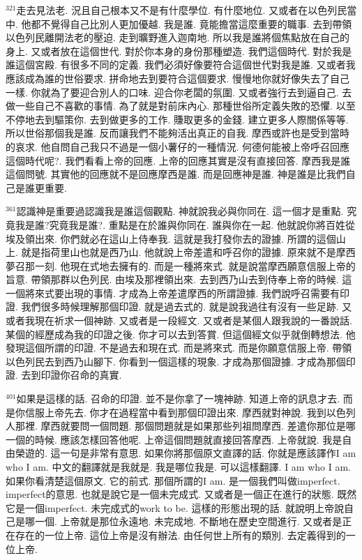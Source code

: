 \documentclass{book}
\begin{document}
$^{321}$走去見法老.
況且自己根本又不是有什麼學位.
有什麼地位.
又或者在以色列民當中.
他都不覺得自己比別人更加優越.
我是誰.
竟能擔當這麼重要的職事.
去到帶領以色列民離開法老的壓迫.
走到曠野進入迦南地.
所以我是誰將個焦點放在自己的身上.
又或者放在這個世代.
對於你本身的身份那種塑造.
我們這個時代.
對於我是誰這個宮殿.
有很多不同的定義.
我們必須好像要符合這個世代對我是誰.
又或者我應該成為誰的世俗要求.
拼命地去到要符合這個要求.
慢慢地你就好像失去了自己一樣.
你就為了要迎合別人的口味.
迎合你老闆的氛圍.
又或者強行去到逼自己.
去做一些自己不喜歡的事情.
為了就是對前床內心.
那種世俗所定義失敗的恐懼.
以至不停地去到驅策你.
去到做更多的工作.
賺取更多的金錢.
建立更多人際關係等等.
所以世俗那個我是誰.
反而讓我們不能夠活出真正的自我.
摩西或許也是受到當時的哀求.
他自問自己我只不過是一個小薯仔的一種情況.
何德何能被上帝呼召回應這個時代呢?.
我們看看上帝的回應.
上帝的回應其實是沒有直接回答.
摩西我是誰這個問號.
其實他的回應就不是回應摩西是誰.
而是回應神是誰.
神是誰是比我們自己是誰更重要.

$^{361}$認識神是重要過認識我是誰這個觀點.
神就說我必與你同在.
這一個才是重點.
究竟我是誰?究竟我是誰?.
重點是在於誰與你同在.
誰與你在一起.
他就說你將百姓從埃及領出來.
你們就必在這山上侍奉我.
這就是我打發你去的證據.
所謂的這個山上.
就是指荷里山也就是西乃山.
他就說上帝差遣和呼召你的證據.
原來就不是摩西夢召那一刻.
他現在式地去擁有的.
而是一種將來式.
就是說當摩西願意信服上帝的旨意.
帶領那群以色列民.
由埃及那裡領出來.
去到西乃山去到侍奉上帝的時候.
這一個將來式要出現的事情.
才成為上帝差遣摩西的所謂證據.
我們說呼召需要有印證.
我們很多時候理解那個印證.
就是過去式的.
就是說我過往有沒有一些足跡.
又或者我現在祈求一個神跡.
又或者是一段經文.
又或者是某個人跟我說的一番說話.
某個的經歷成為我的印證之後.
你才可以去到答賞.
但這個經文似乎就倒轉想法.
他發現這個所謂的印證.
不是過去和現在式.
而是將來式.
而是你願意信服上帝.
帶領以色列民去到西乃山腳下.
你看到一個這樣的現象.
才成為那個證據.
才成為那個印證.
去到印證你召命的真實.

$^{401}$如果是這樣的話.
召命的印證.
並不是你拿了一塊神跡.
知道上帝的訊息才去.
而是你信服上帝先去.
你才在過程當中看到那個印證出來.
摩西就對神說.
我到以色列人那裡.
摩西就要問一個問題.
那個問題就是如果那些列祖問摩西.
差遣你那位是哪一個的時候.
應該怎樣回答他呢.
上帝這個問題就直接回答摩西.
上帝就說.
我是自由榮遊的.
這一句是非常有意思.
如果你將那個原文直譯的話.
你就是應該譯作I am who I am.
中文的翻譯就是我就是.
我是哪位我是.
可以這樣翻譯.
I am who I am.
如果你看清楚這個原文.
它的前式.
那個所謂的I am.
是一個我們叫做imperfect.
imperfect的意思.
也就是說它是一個未完成式.
又或者是一個正在進行的狀態.
既然它是一個imperfect.
未完成式的work to be.
這樣的形態出現的話.
就說明上帝說自己是哪一個.
上帝就是那位永遠地.
未完成地.
不斷地在歷史空間進行.
又或者是正在存在的一位上帝.
這位上帝是沒有辦法.
由任何世上所有的類別.
去定義得到的一位上帝.
\end{document}
